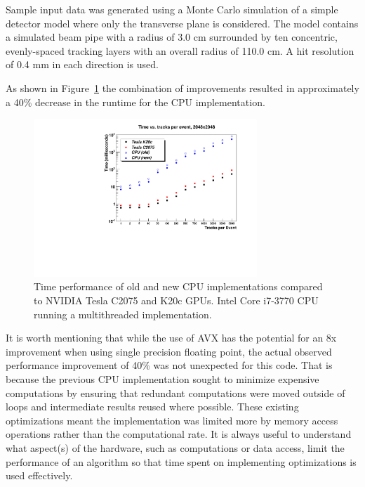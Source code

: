 \documentclass[preprint,sort&compress]{elsarticle}
\begin{document}
Sample input data was generated using a Monte Carlo simulation of a simple detector model where only the transverse plane is considered.  The model contains a simulated beam pipe with a radius of 3.0 cm surrounded by ten concentric, evenly-spaced tracking layers with an overall radius of 110.0 cm.  A hit resolution of 0.4 mm in each direction is used.

As shown in Figure~\ref{fig:TimePerformance} the combination of improvements resulted in approximately a 40\% decrease in the runtime for the CPU implementation.

\begin{figure}[!Hhtb]
\begin{center}
\includegraphics[width=0.75\textwidth]{TimePerformance.pdf} 
\caption{Time performance of old and new CPU implementations compared to NVIDIA Tesla C2075 and K20c GPUs. 
 Intel Core i7-3770 CPU running a multithreaded implementation.\label{fig:TimePerformance}}
\end{center}
\end{figure}

It is worth mentioning that while the use of AVX has the potential for an 8x improvement when using single precision floating point, the actual observed performance improvement of 40\% was not unexpected for this code.  That is because the previous CPU implementation sought to minimize expensive computations by ensuring that redundant computations were moved outside of loops and intermediate results reused where possible.  These existing optimizations meant the implementation was limited more by memory access operations rather than the computational rate.  It is always useful to understand what aspect(s) of the hardware, such as computations or data access, limit the performance of an algorithm so that time spent on implementing optimizations is used effectively.
\end{document}
